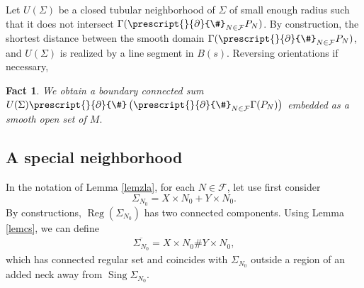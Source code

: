\documentclass[11pt,a4paper]{amsart}
\numberwithin{equation}{section}
\newcommand{\reg}{{\operatorname{Reg}}}
\newcommand{\sing}{{\operatorname{Sing}}}
\newcommand{\Ga}{\Gamma}
\newcommand{\Si}{\Sigma}
\newcommand{\bcs}{\prescript{}{\pd}{\#}}
\newcommand{\ov}[1]{\overline{#1}}
\newcommand{\pd}{\partial}
\theoremstyle{plain}
\newtheorem{fact}[exam]{Fact}
\theoremstyle{definition}
\numberwithin{equation}{subsection}
\begin{document}
	Let $U(\Si)$ be a closed tubular neighborhood of $\Si$ of small enough radius such that it does not intersect $\Ga(\prescript{}{\pd}{\#}_{N\in\mathcal{F}}P_N)$.
	By construction, the shortest distance between the smooth domain $\Ga(\prescript{}{\pd}{\#}_{N\in\mathcal{F}}P_N)$, and $U(\Si)$ is realized by a line segment in $B(s)$. Reversing orientations if necessary,
	\begin{fact}
		We obtain a boundary connected sum $U(\Si)\bcs\left(\prescript{}{\pd}{\#}_{N\in\mathcal{F}}\Ga(P_N)\right)$ embedded as a smooth open set of $M.$
	\end{fact}
	\subsection{A special neighborhood}
	In the notation of Lemma \ref{lemzla}, for each $N\in\mathcal{F}$, let use first consider $$\Si_{N_0}=X\times N_0+Y\times N_0.$$By constructions, $\reg(\Si_{N_0})$ has two connected components. Using Lemma \ref{lemcs}, we can define
	\begin{align*}
		\ov{\Si_{N_0}}=X\times N_0\#Y\times N_0,
	\end{align*}which has connected regular set and coincides with $\Si_{N_0}$ outside a region of an added neck away from $\sing \Si_{N_0}$.
	
\end{document}
